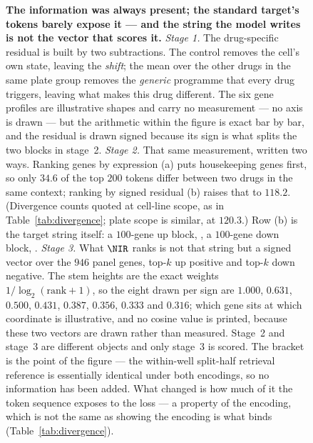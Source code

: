 \begin{figure}[htbp]
\begin{fullwidth}
\caption[The residual, the target string and the scored vector]{\textbf{The
information was always present; the standard target's tokens barely expose it
--- and the string the model writes is not the vector that scores it.}
\emph{Stage 1.} The drug-specific residual is built by two subtractions. The
control removes the cell's own state, leaving the \emph{shift}; the mean over
the other drugs in the same plate group removes the \emph{generic} programme
that every drug triggers, leaving what makes this drug different. The six
gene profiles are illustrative shapes and carry no measurement --- no axis is
drawn --- but the arithmetic within the figure is exact bar by bar, and the
residual is drawn signed because its sign is what splits the two blocks in
stage~2. \emph{Stage 2.} That same measurement, written two ways. Ranking genes
by expression (a) puts housekeeping genes first, so only $34.6$ of the top $200$
tokens differ between two drugs in the same context; ranking by signed residual
(b) raises that to $118.2$. (Divergence counts quoted at cell-line scope, as in
Table~\ref{tab:divergence}; plate scope is similar, at $120.3$.) Row (b) is the
target string itself: a $100$-gene up block, \DOWN, a $100$-gene down block,
\ENDCELL. \emph{Stage 3.} What $\NIR$ ranks is not that string but a signed
vector over the $946$ panel genes, top-$k$ up positive and top-$k$ down
negative. The stem heights are the exact weights $1/\log_2(\textrm{rank}+1)$, so
the eight drawn per sign are $1.000$, $0.631$, $0.500$, $0.431$, $0.387$,
$0.356$, $0.333$ and $0.316$; which gene sits at which coordinate is
illustrative, and no cosine value is printed, because these two vectors are
drawn rather than measured. Stage~2 and stage~3 are different objects and only
stage~3 is scored. The bracket is the point of the figure --- the within-well
split-half retrieval reference is essentially identical under both encodings, so
no information has been added. What changed is how much of it the token sequence
exposes to the loss --- a property of the encoding, which is not the same as
showing the encoding is what binds (Table~\ref{tab:divergence}).}
\label{fig:frame}
\end{fullwidth}
\end{figure}

